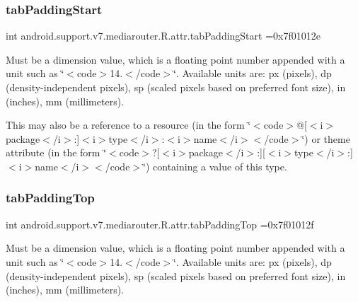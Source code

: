 \subsubsection{\texorpdfstring{tab\+Padding\+Start}{tabPaddingStart}}
{\footnotesize\ttfamily int android.\+support.\+v7.\+mediarouter.\+R.\+attr.\+tab\+Padding\+Start =0x7f01012e\hspace{0.3cm}{\ttfamily [static]}}

Must be a dimension value, which is a floating point number appended with a unit such as \char`\"{}$<$code$>$14.\+5sp$<$/code$>$\char`\"{}. Available units are\+: px (pixels), dp (density-\/independent pixels), sp (scaled pixels based on preferred font size), in (inches), mm (millimeters). 

This may also be a reference to a resource (in the form \char`\"{}$<$code$>$@\mbox{[}$<$i$>$package$<$/i$>$\+:\mbox{]}$<$i$>$type$<$/i$>$\+:$<$i$>$name$<$/i$>$$<$/code$>$\char`\"{}) or theme attribute (in the form \char`\"{}$<$code$>$?\mbox{[}$<$i$>$package$<$/i$>$\+:\mbox{]}\mbox{[}$<$i$>$type$<$/i$>$\+:\mbox{]}$<$i$>$name$<$/i$>$$<$/code$>$\char`\"{}) containing a value of this type. \mbox{\label{classandroid_1_1support_1_1v7_1_1mediarouter_1_1R_1_1attr_aa6eee4f776b2db8b059c557010911559}} 
\subsubsection{\texorpdfstring{tab\+Padding\+Top}{tabPaddingTop}}
{\footnotesize\ttfamily int android.\+support.\+v7.\+mediarouter.\+R.\+attr.\+tab\+Padding\+Top =0x7f01012f\hspace{0.3cm}{\ttfamily [static]}}

Must be a dimension value, which is a floating point number appended with a unit such as \char`\"{}$<$code$>$14.\+5sp$<$/code$>$\char`\"{}. Available units are\+: px (pixels), dp (density-\/independent pixels), sp (scaled pixels based on preferred font size), in (inches), mm (millimeters). 

